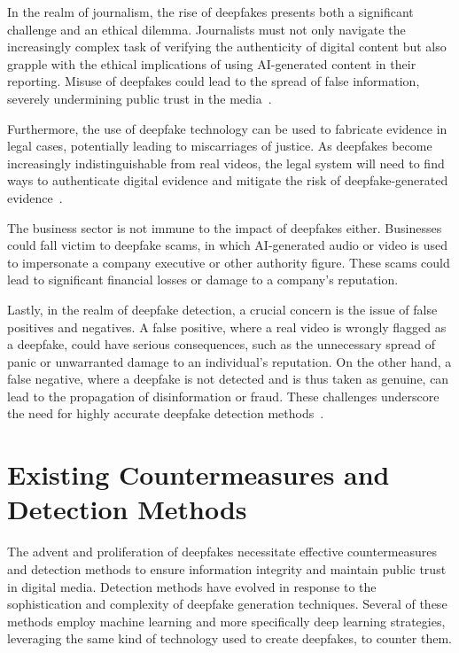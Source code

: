 In the realm of journalism, the rise of deepfakes presents both a significant
challenge and an ethical dilemma. Journalists must not only navigate
the increasingly complex task of verifying the authenticity of digital
content but also grapple with the ethical implications of using \ac{AI}-generated
content in their reporting. Misuse of deepfakes could lead to the spread of
false information, severely undermining public trust in the media~\cite{doi:10.1177/2056305120903408}.

Furthermore, the use of deepfake technology can be used to fabricate evidence in
legal cases, potentially leading to miscarriages of justice. As deepfakes become
increasingly indistinguishable from real videos, the legal system will need to
find ways to authenticate digital evidence and mitigate the risk of deepfake-generated
evidence~\cite{chesney2019deep}.

The business sector is not immune to the impact of deepfakes either. Businesses
could fall victim to deepfake scams, in which \ac{AI}-generated audio or video
is used to impersonate a company executive or other authority figure.
These scams could lead to significant financial losses or damage to a
company's reputation.

Lastly, in the realm of deepfake detection, a crucial concern is the issue of
false positives and negatives. A false positive, where a real video is wrongly
flagged as a deepfake, could have serious consequences, such as the unnecessary
spread of panic or unwarranted damage to an individual's reputation. On the
other hand, a false negative, where a deepfake is not detected and is thus
taken as genuine, can lead to the propagation of disinformation or fraud.
These challenges underscore the need for highly accurate deepfake detection methods~\cite{rössler2019faceforensics}.

\section{Existing Countermeasures and Detection Methods}\label{chapter:countermeasures}
The advent and proliferation of deepfakes necessitate effective countermeasures
and detection methods to ensure information integrity and maintain public trust
in digital media. Detection methods have evolved in response to the sophistication
and complexity of deepfake generation techniques. Several of these methods employ
machine learning and more specifically deep learning strategies, leveraging the
same kind of technology used to create deepfakes, to counter them.


